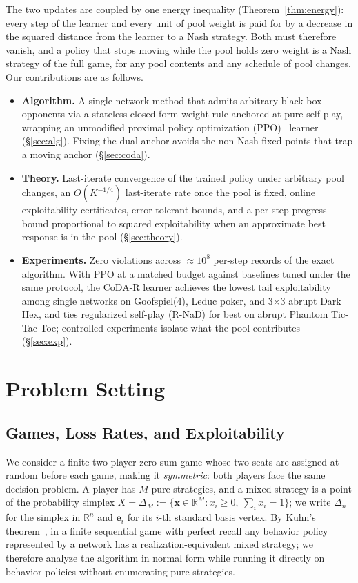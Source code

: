 \documentclass{article} %
\theoremstyle{plain}
\theoremstyle{remark}
\newcommand{\simplex}{\Delta}
\newcommand{\bx}{{\bm{x}}}
\newcommand{\be}{{\bm{e}}}
\newcommand{\codar}{CoDA-R}
\begin{document}
The two updates are coupled by one energy inequality (Theorem~\ref{thm:energy}): every step of the learner and every unit of pool weight is paid for by a decrease in the squared distance from the learner to a Nash strategy. Both must therefore vanish, and a policy that stops moving while the pool holds zero weight is a Nash strategy of the full game, for any pool contents and any schedule of pool changes. Our contributions are as follows.
\begin{itemize}
\item \textbf{Algorithm.} A single-network method that admits arbitrary black-box opponents via a stateless closed-form weight rule anchored at pure self-play, wrapping an unmodified proximal policy optimization (PPO)~\citep{schulman2017ppo} learner (\S\ref{sec:alg}). Fixing the dual anchor avoids the non-Nash fixed points that trap a moving anchor (\S\ref{sec:coda}).
\item \textbf{Theory.} Last-iterate convergence of the trained policy under arbitrary pool changes, an $O(K^{-1/4})$ last-iterate rate once the pool is fixed, online exploitability certificates, error-tolerant bounds, and a per-step progress bound proportional to squared exploitability when an approximate best response is in the pool (\S\ref{sec:theory}).
\item \textbf{Experiments.} Zero violations across $\approx10^8$ per-step records of the exact algorithm. With PPO at a matched budget against baselines tuned under the same protocol, the \codar{} learner achieves the lowest tail exploitability among single networks on Goofspiel(4), Leduc poker, and 3$\times$3 abrupt Dark Hex, and ties regularized self-play (R-NaD) for best on abrupt Phantom Tic-Tac-Toe; controlled experiments isolate what the pool contributes (\S\ref{sec:exp}).
\end{itemize}

\section{Problem Setting}
\label{sec:prelim}

\subsection{Games, Loss Rates, and Exploitability}

We consider a finite two-player zero-sum game whose two seats are assigned at random before each game, making it \emph{symmetric}: both players face the same decision problem. A player has $M$ pure strategies, and a mixed strategy is a point of the probability simplex $X=\simplex_M:=\{\bx\in\mathbb R^M:x_i\ge0,\ \sum_ix_i=1\}$; we write $\simplex_n$ for the simplex in $\mathbb R^n$ and $\be_i$ for its $i$-th standard basis vertex. By Kuhn's theorem~\citep{kuhn1953}, in a finite sequential game with perfect recall any behavior policy represented by a network has a realization-equivalent mixed strategy; we therefore analyze the algorithm in normal form while running it directly on behavior policies without enumerating pure strategies.
\end{document}
